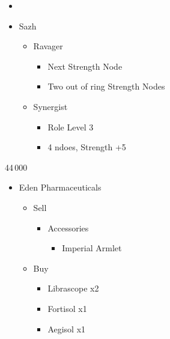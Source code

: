 \begin{menu}
\begin{multicols}{2}
\begin{itemize}
    \paradigm
    \begin{itemize}
        \item {}%
{\paradigmline{\com}{\com}{\med}}%
{\paradigmline[2]{\textit{\com}}{\textit{\com}}{\textit{(\rav)}}}%
{\paradigmline{(\sen)}{(\sen)}{\med}}%
{\paradigmline{(\syn)}{\rav}{\rav}}%
{\paradigmline{\sab}{\rav}{\rav}}%
{\paradigmline{\rav}{\rav}{\rav}}
    \end{itemize}
    \crystarium
    \begin{itemize}
        \item Sazh
        \begin{itemize}
            \item Ravager
            \begin{itemize}
                \item Next Strength Node
                \item Two out of ring Strength Nodes
            \end{itemize}
            \item Synergist
            \begin{itemize}
                \item Role Level 3
                \item 4 ndoes, Strength +5
            \end{itemize}
        \end{itemize}
    \end{itemize}
\end{itemize}
\end{multicols}
\end{menu}
\begin{shop}{44\,000}
\begin{itemize}
    \item Eden Pharmaceuticals
    \begin{itemize}
        \item Sell
        \begin{itemize}
            \item Accessories
            \begin{itemize}
                \item Imperial Armlet
            \end{itemize}
        \end{itemize}
        \item Buy
        \begin{itemize}
            \item Librascope x2
            \item Fortisol x1
            \item Aegisol x1
        \end{itemize}
    \end{itemize}
\end{itemize}
\end{shop}

